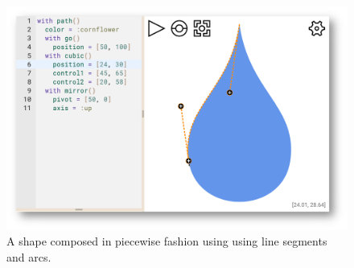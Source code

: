 \begin{figure}
\centering
\includegraphics[width=\linewidth]{pixels/droplet}
\caption{A shape composed in piecewise fashion using using line segments and arcs.}
\label{figure:droplet}
\end{figure}
